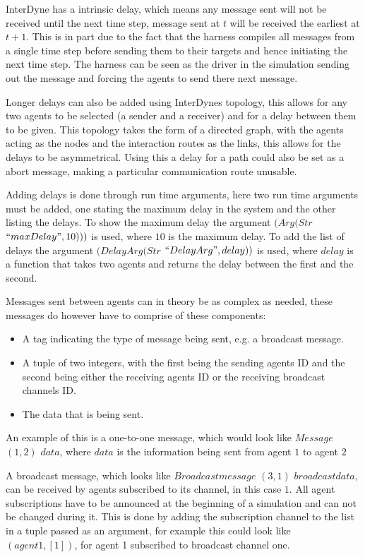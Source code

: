 \documentclass{article}
\begin{document}
InterDyne has a intrinsic delay, which means any message sent will not be received until the next time step, message sent at $t$ will be received the earliest at $t+1$. This is in part due to the fact that the harness compiles all messages from a single time step before sending them to their targets and hence initiating the next time step. The harness can be seen as the driver in the simulation sending out the message and forcing the agents to send there next message.   

Longer delays can also be added using InterDynes topology, this allows for any two agents to be selected (a sender and a receiver) and for a delay between them to be given. This topology takes the form of a directed graph, with the agents acting as the nodes and the interaction routes as the links, this allows for the delays to be asymmetrical. Using this a delay for a path could also be set as a abort message, making a particular communication route unusable.  

Adding delays is done through run time arguments, here two run time arguments must be added, one stating the maximum delay in the system and the other listing the delays. To show the maximum delay the argument $(Arg (Str$  $``maxDelay", 10)))$ is used, where $10$ is the maximum delay. To add the list of delays the argument $(DelayArg (Str$  $``DelayArg", delay))$ is used, where $delay$ is a function that takes two agents and returns the delay between the first and the second. 

Messages sent between agents can in theory be as complex as needed, these messages do however have to comprise of these components: 
\begin{itemize}
   \item A tag indicating the type of message being sent, e.g. a broadcast message.
   \item A tuple of two integers, with the first being the sending agents ID and the second being either the receiving agents ID or the receiving broadcast channels ID.  
   \item The data that is being sent. 
\end{itemize}
An example of this is a one-to-one message, which would look like $Message$ $(1, 2)$ $data$, where $data$ is the information being sent from agent $1$ to agent $2$ 

A broadcast message, which looks like $Broadcastmessage$ $(3, 1)$ $broadcastdata$, can be received by agents subscribed to its channel, in this case $1$. All agent subscriptions have to be announced at the beginning of a simulation and can not be changed during it. This is done by adding the subscription channel to the list in a tuple passed as an argument, for example this could look like $(agent1, [1])$, for agent 1 subscribed to broadcast channel one.
\end{document}
